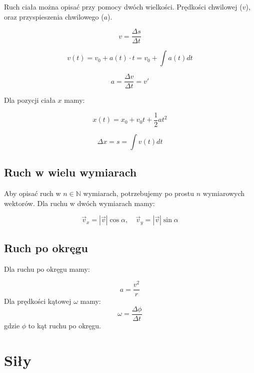 \documentclass{../notatki}
\begin{document}
Ruch ciała można opisać przy pomocy dwóch wielkości. Prędkości chwilowej ($v$),
oraz przyspieszenia chwilowego ($a$).

$$
v = \frac{\Delta s}{\Delta t}
$$

$$
v(t) = v_0 + a(t) \cdot t = v_0 + \int a(t) dt
$$

$$
a = \frac{\Delta v}{\Delta t} = v'
$$

Dla pozycji ciała $x$ mamy:

$$
x(t) = x_0 + v_0t + \frac{1}{2}a t^2
$$

$$
\Delta x = s = \int v(t) dt
$$

\subsection{Ruch w wielu wymiarach}

Aby opisać ruch w $n \in \mathbb{N}$ wymiarach, potrzebujemy po prostu $n$
wymiarowych wektorów. Dla ruchu w dwóch wymiarach mamy:

\begin{figure*}[h]
  \centering
\end{figure*}

$$
\vec{v}_x = |\vec{v}| \cos \alpha, \quad \vec{v}_y = |\vec{v}| \sin \alpha
$$

\subsection{Ruch po okręgu}

Dla ruchu po okręgu mamy:

$$
a = \frac{v^2}{r}
$$
Dla prędkości kątowej $\omega$ mamy:
$$
\omega = \frac{\Delta \phi}{\Delta t}
$$
gdzie $\phi$ to kąt ruchu po okręgu.

\section{Siły}
\end{document}
